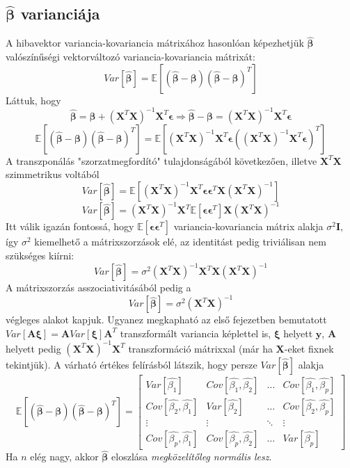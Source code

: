\documentclass[14p]{report}
\def\pmb{\boldsymbol}
\def\ebeta{\hat{\pmb{\beta}}}
\def\e{\epsilon}
\begin{document}
\subsection{$\ebeta$ varianciája}
A hibavektor variancia-kovariancia mátrixához hasonlóan képezhetjük $\ebeta$ valószínűségi vektorváltozó variancia-kovariancia mátrixát:
\[
	Var[\ebeta] = \mathbb{E}[(\ebeta - \pmb{\beta})(\ebeta - \pmb{\beta})^T]
\]
Láttuk, hogy
\[
	\ebeta = \pmb{\beta} + (\pmb{X}^T\pmb{X})^{-1}\pmb{X}^T\pmb{\e} \Longrightarrow \ebeta - \pmb{\beta} = (\pmb{X}^T\pmb{X})^{-1}\pmb{X}^T\pmb{\e}
\]
\[
	\mathbb{E}[(\ebeta - \pmb{\beta})(\ebeta - \pmb{\beta})^T] = 
	\mathbb{E}\left[
		(\pmb{X}^T\pmb{X})^{-1}\pmb{X}^T\pmb{\e}((\pmb{X}^T\pmb{X})^{-1}\pmb{X}^T\pmb{\e})^T
	\right]
\]
A transzponálás "szorzatmegfordító" tulajdonságából következően, illetve $\pmb{X}^T\pmb{X}$ szimmetrikus voltából
\[
	Var[\ebeta] = 
	\mathbb{E}\left[
			(\pmb{X}^T\pmb{X})^{-1}\pmb{X}^T\pmb{\e}\pmb{\e}^T\pmb{X}(\pmb{X}^T\pmb{X})^{-1}
	\right]
\]
\[
	Var[\ebeta] = (\pmb{X}^T\pmb{X})^{-1}\pmb{X}^T\mathbb{E}[\pmb{\e}\pmb{\e}^T]\pmb{X}(\pmb{X}^T\pmb{X})^{-1}
\]
Itt válik igazán fontossá, hogy $\mathbb{E}[\pmb{\e}\pmb{\e}^T]$ variancia-kovariancia mátrix alakja $\sigma^2\pmb{I}$, így $\sigma^2$ kiemelhető a mátrixszorzások elé, az identitást pedig triviálisan nem szükséges kiírni:
\[
	Var[\ebeta] = \sigma^2(\pmb{X}^T\pmb{X})^{-1}\pmb{X}^T\pmb{X}(\pmb{X}^T\pmb{X})^{-1}
\]
A mátrixszorzás asszociativitásából pedig a
\[
	Var[\ebeta] = \sigma^2(\pmb{X}^T\pmb{X})^{-1}
\]
végleges alakot kapjuk. Ugyanez megkapható az első fejezetben bemutatott $Var[\pmb{A}\pmb{\xi}] = \pmb{A}Var[\pmb{\xi}]\pmb{A}^T$ transzformált variancia képlettel is, $\pmb{\xi}$ helyett $\pmb{y}$, $\pmb{A}$ helyett pedig $(\pmb{X}^T\pmb{X})^{-1}\pmb{X}^T$ transzformáció mátrixxal (már ha $\pmb{X}$-eket fixnek tekintjük). A várható értékes felírásból látszik, hogy persze $Var[\ebeta]$ alakja
\[
	\mathbb{E}[(\ebeta - \pmb{\beta})(\ebeta - \pmb{\beta})^T] =
	\begin{bmatrix}
	Var[\hat{\beta_1}] & Cov[\hat{\beta_1},\hat{\beta_2}] & \dots & Cov[\hat{\beta_1},\hat{\beta_p}] \\
	Cov[\hat{\beta_2},\hat{\beta_1}] & Var[\hat{\beta_2}] & \dots & Cov[\hat{\beta_2},\hat{\beta_p}] \\
	\vdots & \vdots & \ddots & \vdots \\
	Cov[\hat{\beta_p},\hat{\beta_1}] & Cov[\hat{\beta_p},\hat{\beta_2}] & \dots & Var[\hat{\beta_p}]
	\end{bmatrix}
\]
Ha $n$ elég nagy, akkor $\ebeta$ eloszlása \emph{megközelítőleg normális lesz}.
\end{document}
